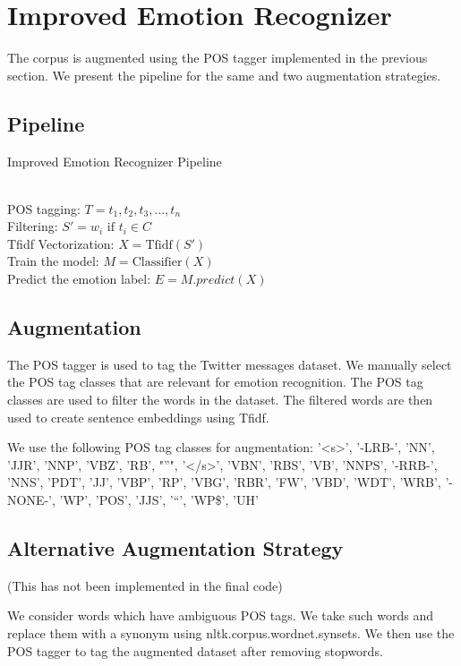 \documentclass{article}
\begin{document}
\section{Improved Emotion Recognizer}

The corpus is augmented using the POS tagger implemented in the previous section. We present the pipeline for the same and two augmentation strategies.

\subsection{Pipeline}
\begin{algorithm}
\caption{Improved Emotion Recognizer Pipeline}
\SetAlgoLined
{}
\texttt{\\}
POS tagging: $T = t_1, t_2, t_3, ..., t_n$\\
Filtering: $S' = w_i \text{ if } t_i \in C$\\
Tfidf Vectorization: $X = \text{Tfidf}(S')$\\
Train the model: $M = \text{Classifier}(X)$\\
Predict the emotion label: $E = M.predict(X)$
\end{algorithm}

\subsection{Augmentation}
The POS tagger is used to tag the Twitter messages dataset. We manually select the POS tag classes that are relevant for emotion recognition. The POS tag classes are used to filter the words in the dataset. The filtered words are then used to create sentence embeddings using Tfidf.

We use the following POS tag classes for augmentation: {'<s>', '-LRB-', 'NN', 'JJR', 'NNP', 'VBZ', 'RB', "''", '</s>', 'VBN', 'RBS', 'VB', 'NNPS', '-RRB-', 'NNS', 'PDT', 'JJ', 'VBP', 'RP', 'VBG', 'RBR', 'FW', 'VBD', 'WDT', 'WRB', '-NONE-', 'WP', 'POS', 'JJS', '``', 'WP\$', 'UH'}

\subsection{Alternative Augmentation Strategy}
(This has not been implemented in the final code)

We consider words which have ambiguous POS tags. We take such words and replace them with a synonym using nltk.corpus.wordnet.synsets. We then use the POS tagger to tag the augmented dataset after removing stopwords.
\end{document}

